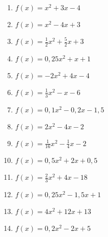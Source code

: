 \begin{Exercise}[title={Bestimme die Nullstellen}, label=normalformNullstellenA1]
	
	\begin{minipage}{\textwidth}
		\begin{minipage}{0.49\textwidth}
			\begin{enumerate}[label=\alph*)]
				\item \(f(x)=x^2+3x-4\)
				\item \(f(x)=x^2-4x+3\)
				\item \(f(x)=\frac{1}{2}x^2+\frac{5}{2}x+3\)
				\item \(f(x)=0,25x^2+x+1\)
				\item \(f(x)=-2x^2+4x-4\)
				\item \(f(x)=\frac{1}{3}x^2-x-6\)
				\item \(f(x)=0,1x^2-0,2x-1,5\)
			\end{enumerate}
		\end{minipage}
		\begin{minipage}{0.49\textwidth}
			\begin{enumerate}[label=\alph*)]
				\setcounter{enumi}{7}
				\item \(f(x)=2x^2-4x-2\)
				\item \(f(x)=\frac{1}{16}x^2-\frac{1}{4}x-2\)
				\item \(f(x)=0,5x^2+2x+0,5\)
				\item \(f(x)=\frac{2}{3}x^2+4x-18\)
				\item \(f(x)=0,25x^2-1,5x+1\)
				\item \(f(x)=4x^2+12x+13\)
				\item \(f(x)=0,2x^2-2x+5\)
			\end{enumerate}
		\end{minipage}
	\end{minipage}
\end{Exercise}

